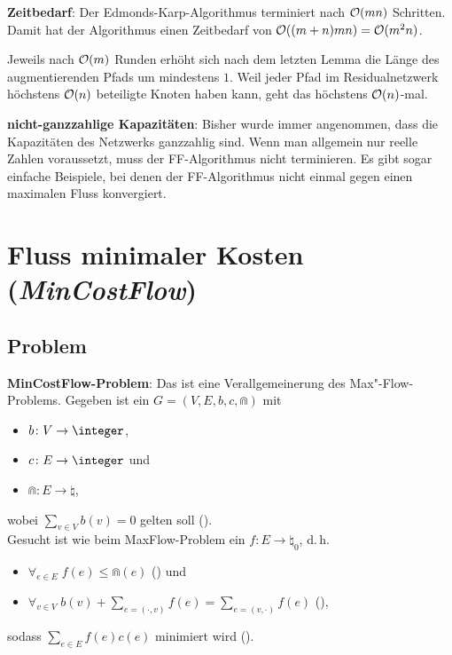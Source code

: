 \textbf{Zeitbedarf}:
Der Edmonds-Karp-Algorithmus terminiert nach $\mathcal{O}(mn)$ Schritten.\\
Damit hat der Algorithmus einen Zeitbedarf von $\mathcal{O}((m+n)mn) = \mathcal{O}(m^2 n)$.

\begin{Beweis}
    Jeweils nach $\mathcal{O}(m)$ Runden erhöht sich nach dem letzten Lemma die Länge des augmentierenden
    Pfads um mindestens $1$.
    Weil jeder Pfad im Residualnetzwerk höchstens $\mathcal{O}(n)$ beteiligte Knoten haben kann,
    geht das höchstens $\mathcal{O}(n)$-mal.
\end{Beweis}

\linie

\textbf{nicht-ganzzahlige Kapazitäten}:
Bisher wurde immer angenommen, dass die Kapazitäten des Netzwerks ganzzahlig sind.
Wenn man allgemein nur reelle Zahlen voraussetzt, muss der FF-Algorithmus nicht terminieren.
Es gibt sogar einfache Beispiele, bei denen der FF-Algorithmus nicht einmal gegen einen
maximalen Fluss konvergiert.

\pagebreak

\section{%
    Fluss minimaler Kosten (\emph{MinCostFlow})%
}

\subsection{%
    Problem%
}

\textbf{MinCostFlow-Problem}:
Das  ist eine Verallgemeinerung des Max"-Flow-Problems.
Gegeben ist ein  $G = (V, E, b, c, \Cap)$ mit
\begin{itemize}
    \item
     $b\colon V \to \integer$,

    \item
     $c\colon E \to \integer$ und

    \item
     $\Cap\colon E \to \natural$,
\end{itemize}
wobei $\sum_{v \in V} b(v) = 0$ gelten soll ().\\
Gesucht ist wie beim MaxFlow-Problem ein  $f\colon E \to \natural_0$,
d.\,h.
\begin{itemize}
    \item
    $\forall_{e \in E}\; f(e) \le \Cap(e)$
    () und

    \item
    $\forall_{v \in V}\;
    b(v) + \sum_{e = (\cdot, v)} f(e) = \sum_{e = (v, \cdot)} f(e)$
    (),
\end{itemize}
sodass $\sum_{e \in E} f(e)c(e)$ minimiert wird ().

